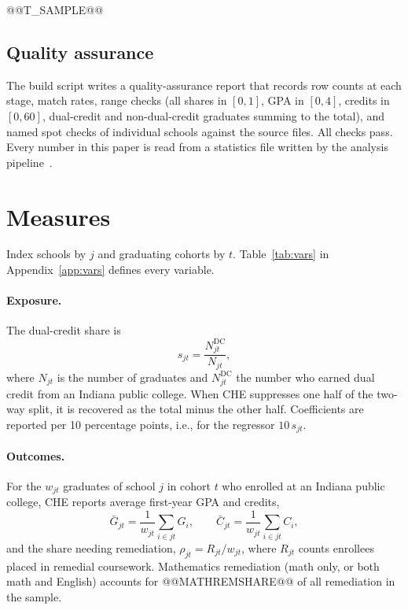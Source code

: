 \documentclass[aps,prd,reprint,superscriptaddress,nofootinbib,floatfix]{revtex4-2}
\newcommand{\DC}{\mathrm{DC}}
\begin{document}
@@T_SAMPLE@@

\subsection{Quality assurance}

The build script writes a quality-assurance report that records row counts at each stage, match rates, range checks (all shares in $[0,1]$, GPA in $[0,4]$, credits in $[0,60]$, dual-credit and non-dual-credit graduates summing to the total), and named spot checks of individual schools against the source files. All checks pass. Every number in this paper is read from a statistics file written by the analysis pipeline~\cite{repo}.

\section{Measures}\label{sec:measures}

Index schools by $j$ and graduating cohorts by $t$. Table~\ref{tab:vars} in Appendix~\ref{app:vars} defines every variable.

\paragraph*{Exposure.} The dual-credit share is
\begin{equation}
s_{jt}=\frac{N^{\DC}_{jt}}{N_{jt}},\label{eq:share}
\end{equation}
where $N_{jt}$ is the number of graduates and $N^{\DC}_{jt}$ the number who earned dual credit from an Indiana public college. When CHE suppresses one half of the two-way split, it is recovered as the total minus the other half. Coefficients are reported per 10 percentage points, i.e., for the regressor $10\,s_{jt}$.

\paragraph*{Outcomes.} For the $w_{jt}$ graduates of school $j$ in cohort $t$ who enrolled at an Indiana public college, CHE reports average first-year GPA and credits,
\begin{equation}
\bar G_{jt}=\frac{1}{w_{jt}}\sum_{i\in jt}G_i,\qquad \bar C_{jt}=\frac{1}{w_{jt}}\sum_{i\in jt}C_i,\label{eq:outcomes}
\end{equation}
and the share needing remediation, $\rho_{jt}=R_{jt}/w_{jt}$, where $R_{jt}$ counts enrollees placed in remedial coursework. Mathematics remediation (math only, or both math and English) accounts for @@MATHREMSHARE@@ of all remediation in the sample.
\end{document}
